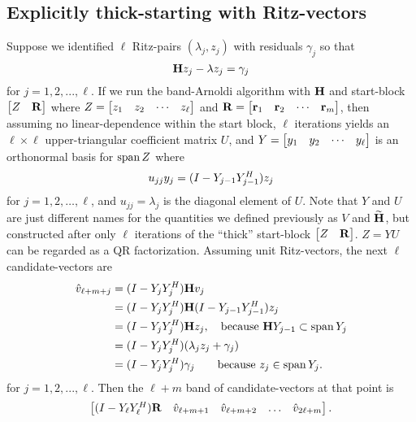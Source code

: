  
\subsection{Explicitly thick-starting with Ritz-vectors}\label{sec:ritz_restart}
Suppose we identified $\ell$ Ritz-pairs $(\lambda_j,z_j)$ with residuals $\gamma_j$ so that 
\begin{equation}
\textbf{\textup{H}} z_j - \lambda z_j = \gamma_j
\label{eq:Ritz_and_resid}
\end{equation}
for $j=1,2,...,\ell$.
If we run the band-Arnoldi algorithm with $\textbf{\textup{H}}$ and start-block $\begin{bmatrix} Z&\textbf{\textup{R}}\end{bmatrix}$ where $Z=\begin{bmatrix} z_1&z_2&\cdots&z_\ell\end{bmatrix}$ and $\textbf{\textup{R}}=\begin{bmatrix} \textbf{\textup{r}}_1&\textbf{\textup{r}}_2&\cdots&\textbf{\textup{r}}_m\end{bmatrix}$, then assuming no linear-dependence within the start block, $\ell$ iterations yields an $\ell\times\ell$ upper-triangular coefficient matrix $U$, and  $Y =\begin{bmatrix} y_1&y_2&\cdots&y_\ell\end{bmatrix}$ is an orthonormal basis for $\operatorname*{span} Z$ where 
\[
u_{jj} y_j = (I - Y_{j-1}Y_{j-1}^H)z_j
\]    
for $j=1,2,\ldots,\ell$, and 
$u_{jj}=\lambda_j$ is the diagonal element of $U$. Note that $Y$ and $U$ are just different names for the quantities we defined previously as $V$ and $\widetilde{\textbf{\textup{H}}}$, but constructed after only $\ell$ iterations of the ``thick'' start-block $\begin{bmatrix} Z&\textbf{\textup{R}}\end{bmatrix}$.   $Z = Y U$ can be regarded as a QR factorization.  Assuming unit Ritz-vectors, the next $\ell$ candidate-vectors are
\begin{equation}
\begin{aligned}
\hat{v}_{\ell+m+j} &= (I-Y_jY_j^H)\textbf{\textup{H}} v_j\\
&= (I-Y_jY_j^H)\textbf{\textup{H}}   (I - Y_{j-1}Y_{j-1}^H)z_j\\
&=  (I-Y_jY_j^H)\textbf{\textup{H}} z_j, \quad\text{because } \textbf{\textup{H}} Y_{j-1} \subset \operatorname*{span} Y_j \\
&=   (I-Y_jY_j^H)(\lambda_j z_j + \gamma_j)\\
&= (I-Y_jY_j^H) \gamma_j \qquad \text{because } z_j\in\operatorname*{span} Y_j. 
\end{aligned}
\label{eq:candies}
\end{equation}
for $j=1,2,...,\ell$.
Then the  $\ell+m$ band of candidate-vectors at that point is  
\begin{equation}
\begin{bmatrix} (I - Y_\ell Y_\ell^H)\textbf{\textup{R}} & \hat{v}_{\ell+m+1} & \hat{v}_{\ell+m+2} & \ldots& \hat{v}_{2\ell+m}\end{bmatrix}.
\label{eq:thick_restart_preload}
\end{equation}


